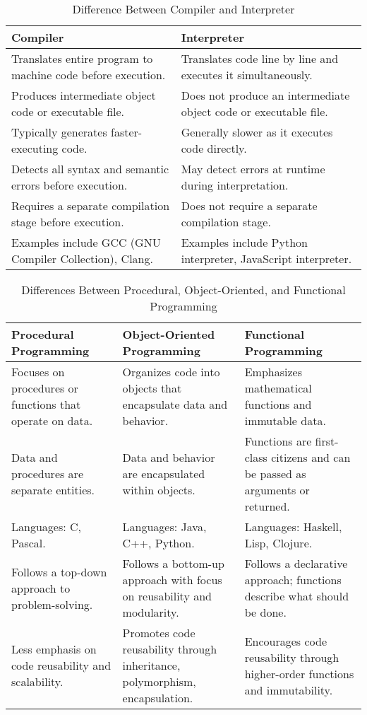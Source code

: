 \begin{table}[H]
    \centering 
    \caption{Difference Between Compiler and Interpreter}
    \begin{tabular}{|p{}|p{}|}
        \hline
        \textbf{Compiler} & \textbf{Interpreter} \\
        \hline
        Translates entire program to machine code before execution. & Translates code line by line and executes it simultaneously. \\
        \hline
        Produces intermediate object code or executable file. & Does not produce an intermediate object code or executable file. \\
        \hline
        Typically generates faster-executing code. & Generally slower as it executes code directly. \\
        \hline
        Detects all syntax and semantic errors before execution. & May detect errors at runtime during interpretation. \\
        \hline
        Requires a separate compilation stage before execution. & Does not require a separate compilation stage. \\
        \hline
        Examples include GCC (GNU Compiler Collection), Clang. & Examples include Python interpreter, JavaScript interpreter. \\
        \hline
    \end{tabular}
\end{table}


\begin{table}[H]
    \caption{Differences Between Procedural, Object-Oriented, and Functional Programming}
    
    \begin{tabular}{|p{}|p{}|p{}|}
        \hline
        \textbf{Procedural Programming} & \textbf{Object-Oriented Programming} & \textbf{Functional Programming} \\
        \hline
        Focuses on procedures or functions that operate on data. & Organizes code into objects that encapsulate data and behavior. & Emphasizes mathematical functions and immutable data. \\
        \hline
        Data and procedures are separate entities. & Data and behavior are encapsulated within objects. & Functions are first-class citizens and can be passed as arguments or returned. \\
        \hline
        Languages: C, Pascal. & Languages: Java, C++, Python. & Languages: Haskell, Lisp, Clojure. \\
        \hline
        Follows a top-down approach to problem-solving. & Follows a bottom-up approach with focus on reusability and modularity. & Follows a declarative approach; functions describe what should be done. \\
        \hline
        Less emphasis on code reusability and scalability. & Promotes code reusability through inheritance, polymorphism, encapsulation. & Encourages code reusability through higher-order functions and immutability. \\
        \hline
    \end{tabular}
\end{table}